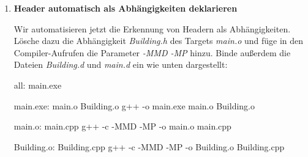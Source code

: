 \begin{enumerate}
Bewege \emph{toString} nun nach \emph{Buidling.h}:
\begin{lstlisting}
#include <sstream>
// ...
inline const std::string toString() const{

    std::stringstream output;
    output << "A building with " << this->numFloors << " floors\n";
    return output.str();
}
\end{lstlisting}

Baue das Projekt; es kompiliert nicht! Warum? Genau aus dem Grund, dass \emph{make} das Header-File nicht \glqq kennt\grqq{}.
Jetzt gibt es im Projekt keine Definition von \emph{toString} wie uns der Linker auch mitteilt:
\begin{verbatim}
main.o:main.cpp:(.text+0x5c): undefined reference to `Building::toString() const'
collect2: ld returned 1 exit status
\end{verbatim}

Das Problem lässt sich lösen, indem wir im Makefile angeben, dass \emph{main.o} nicht nur abhängig von \emph{Building.cpp}, sondern auch von \emph{Building.h} ist:
\begin{lstmake}
# ...
main.o: main.cpp Building.h
	g++ -c -o main.o main.cpp
# ...
\end{lstmake}

Ist das eine schöne Lösung?
Sicherlich nicht, denn ab sofort müssten wir manuell alle Header ins Makefile eintragen, die wir per \emph{\#include} in eine Sourcedatei einbinden.
Schlimmer noch: Wir müssten über rekursive Includes Bescheid wissen, z.B. wenn \emph{Building.h} einen anderen veränderlichen Header wie \emph{Floor.h} einbindet.

Glücklicherweise hilft uns \emph{g++} bei diesem Problem.

\item\textbf{Header automatisch als Abhängigkeiten deklarieren}

Wir automatisieren jetzt die Erkennung von Headern als Abhängigkeiten.
Lösche dazu die Abhängigkeit \emph{Building.h} des Targets \emph{main.o} und füge in den Compiler-Aufrufen die Parameter \emph{-MMD -MP} hinzu.
Binde außerdem die Dateien \emph{Building.d} und \emph{main.d} ein wie unten dargestellt:
\begin{lstmake}
all: main.exe

main.exe: main.o Building.o
	g++ -o main.exe main.o Building.o

main.o: main.cpp
	g++ -c -MMD -MP -o main.o main.cpp

Building.o: Building.cpp
	g++ -c -MMD -MP -o Building.o Building.cpp


\end{lstmake}
\end{enumerate}
